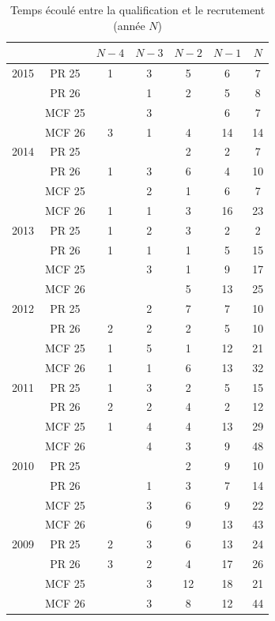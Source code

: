 \begin{table}
\begin{center}
\begin{tabular}{*{7}{c}}
\toprule
&& $N-4$ & $N-3$ & $N-2$ & $N-1$ & $N$ \\
\midrule
2015 	& PR 25 & 1 & 3 & 5 & 6 & 7 \\
	& PR 26 &  & 1 & 2 & 5 & 8 \\
	& MCF 25 &  & 3 &  & 6 & 7 \\
	& MCF 26 & 3 & 1 & 4 & 14 & 14 \\
	\midrule
2014 	& PR 25 &  &  & 2 & 2 & 7 \\
	& PR 26 & 1 & 3 & 6 & 4 & 10 \\
	& MCF 25 &  & 2 & 1 & 6 & 7 \\
	& MCF 26 & 1 & 1 & 3 & 16 & 23 \\
\midrule
2013 	& PR 25 & 1 & 2 & 3 & 2 & 2 \\
	& PR 26 & 1 & 1 & 1 & 5 & 15 \\
	& MCF 25 &  & 3 & 1 & 9 & 17 \\
	& MCF 26 &  &  & 5 & 13 & 25 \\
\midrule
2012	& PR 25 &  & 2 & 7 & 7 & 10 \\
	& PR 26 & 2 & 2 & 2 & 5 & 10 \\
	& MCF 25 & 1 & 5 & 1 & 12 & 21 \\
	& MCF 26 & 1 & 1 & 6 & 13 & 32 \\
\midrule
2011 	& PR 25 & 1 & 3 & 2 & 5 & 15 \\
	& PR 26 & 2 & 2 & 4 & 2 & 12 \\
	& MCF 25 & 1 & 4 & 4 & 13 & 29 \\
	& MCF 26 &  & 4 & 3 & 9 & 48 \\
\midrule
2010 	& PR 25 &  &  & 2 & 9 & 10 \\
	& PR 26 &  & 1 & 3 & 7 & 14 \\
	& MCF 25 &  & 3 & 6 & 9 & 22 \\
	& MCF 26 &  & 6 & 9 & 13 & 43 \\
\midrule
2009	& PR 25 & 2 & 3 & 6 & 13 & 24 \\
	& PR 26 & 3 & 2 & 4 & 17 & 26 \\
	& MCF 25 &  & 3 & 12 & 18 & 21 \\
	& MCF 26 &  & 3 & 8 & 12 & 44 \\
\bottomrule
\end{tabular}
\caption{Temps \'ecoul\'e entre la qualification et le recrutement (ann\'ee $N$)}\label{tab.recrut.anter}
\end{center}
\end{table}
%
%
